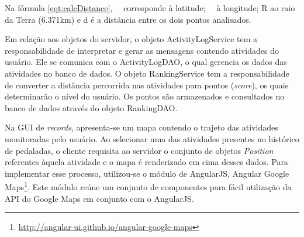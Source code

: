 Na fórmula \ref{eqt:calcDistance}, \varphi \ \  corresponde à latitude; \lambda \ \  à longitude; R ao raio da Terra (6.371km) e d é a distância entre os dois pontos analisados. 
\par
Em relação aos objetos do servidor, o objeto ActivityLogService tem a responsabilidade de interpretar e gerar as mensagens contendo atividades do usuário. Ele se comunica com o ActivityLogDAO, o qual gerencia os dados das atividades no banco de dados. O objeto RankingService tem a responsabilidade de converter a distância percorrida nas atividades para pontos (\textit{score}), os quais determinarão o nível do usuário. Os pontos são armazenados e consultados no banco de dados através do objeto RankingDAO.
\par
Na GUI de \textit{records}, apresenta-se um mapa contendo o trajeto das atividades monitoradas pelo usuário. Ao selecionar uma das atividades presentes no histórico de pedaladas, o cliente requisita ao servidor o conjunto de objetos \textit{Position} referentes àquela atividade e o mapa é renderizado em cima desses dados. Para implementar esse processo, utilizou-se o módulo de AngularJS, Angular Google Maps\footnote{\url{http://angular-ui.github.io/angular-google-maps}}. Este módulo reúne um conjunto de componentes para fácil utilização da API do Google Maps em conjunto com o AngularJS.

